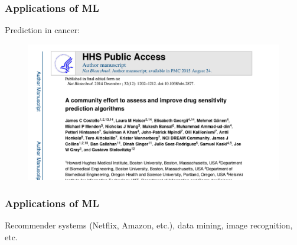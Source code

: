 \documentclass{beamer}
\begin{document}
\begin{frame}
\frametitle{Applications of ML}

Prediction in cancer:

\begin{figure}
\includegraphics[width=1\linewidth]{article_cancer}
\end{figure}

\end{frame}

\begin{frame}
\frametitle{Applications of ML}

Recommender systems (Netflix, Amazon, etc.), data mining, image recognition, etc.

\end{frame}

\end{document}
